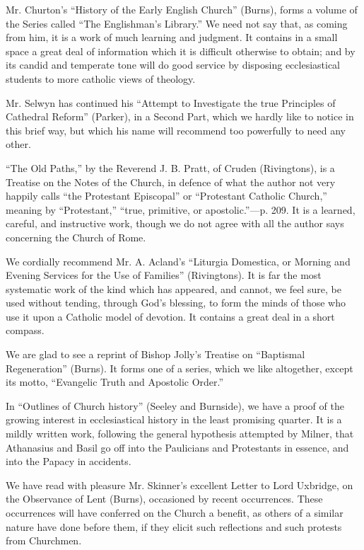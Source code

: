 Mr. Churton's ``History of the Early English Church''
(Burns), forms a volume of the Series called ``The Englishman's Library.''
We need not say that, as coming from him, it is a work of much learning
and judgment. It contains in a small space a great deal of information
which it is difficult otherwise to obtain; and by its candid and
temperate tone will do good service by disposing ecclesiastical students
to more catholic views of theology.

Mr. Selwyn has continued his ``Attempt to
Investigate the true Principles of Cathedral Reform'' (Parker), in a
Second Part, which we hardly like to notice in this brief way, but which
his name will recommend too powerfully to need any other.

``The Old Paths,'' by the Reverend J. B. Pratt, of
Cruden (Rivingtons), is a Treatise on the Notes of the Church, in
defence of what the author not very happily calls ``the Protestant
Episcopal'' or ``Protestant Catholic Church,'' meaning by ``Protestant,'' ``true,
primitive, or apostolic.''—p. 209. It is a learned, careful, and
instructive work, though we do not agree with all the author says
concerning the Church of Rome.

We cordially recommend Mr. A. Acland's ``Liturgia
Domestica, or Morning and Evening Services for the Use of Families'' (Rivingtons).
It is far the most systematic work of the kind which has appeared,
and cannot, we feel sure, be used without tending, through God's
blessing, to form the minds of those who use it upon a Catholic model of
devotion. It contains a great deal in a short compass.

We are glad to see a reprint of Bishop Jolly's
Treatise on ``Baptismal Regeneration'' (Burns). It forms one of a series,
which we like altogether, except its motto, ``Evangelic Truth and
Apostolic Order.''

In ``Outlines of Church history'' (Seeley and
Burnside), we have a proof of the growing interest in ecclesiastical
history in the least promising quarter. It is a mildly written work,
following the general hypothesis attempted by Milner, that Athanasius
and Basil go off into the Paulicians and Protestants in essence, and
into the Papacy in accidents.

We have read with pleasure Mr. Skinner's excellent
Letter to Lord Uxbridge, on the Observance of Lent (Burns), occasioned
by recent occurrences. These occurrences will have conferred on the
Church a benefit, as others of a similar nature have done before them,
if they elicit such reflections and such protests from Churchmen.

